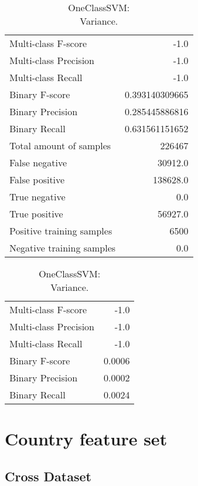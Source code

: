\begin{table}[H]
\begin{minipage}{0.5\textwidth}

\caption{OneClassSVM: \\Average.}

\centering
\begin{tabular}{l r}
\toprule
Multi-class F-score & -1.0 \\
Multi-class Precision & -1.0 \\
Multi-class Recall & -1.0 \\
\midrule
Binary F-score & 0.393140309665 \\
Binary Precision & 0.285445886816 \\
Binary Recall & 0.631561151652 \\
\midrule
Total amount of samples & 226467 \\
False negative & 30912.0 \\
False positive & 138628.0 \\
True negative & 0.0 \\
True positive & 56927.0 \\
\midrule
Positive training samples & 6500 \\
Negative training samples & 0.0 \\
\bottomrule
\end{tabular}

\end{minipage}
\hfillx
\begin{minipage}{0.5\textwidth}
\caption{OneClassSVM: \\Variance.}

\centering
\begin{tabular}{l r}
\toprule
Multi-class F-score & -1.0 \\
Multi-class Precision & -1.0 \\
Multi-class Recall & -1.0 \\
\midrule
Binary F-score & 0.0006 \\
Binary Precision & 0.0002 \\
Binary Recall & 0.0024 \\
\bottomrule
\end{tabular}
\end{minipage}
\end{table}


\newpage
\section{Country feature set}
\subsection{Cross Dataset}


